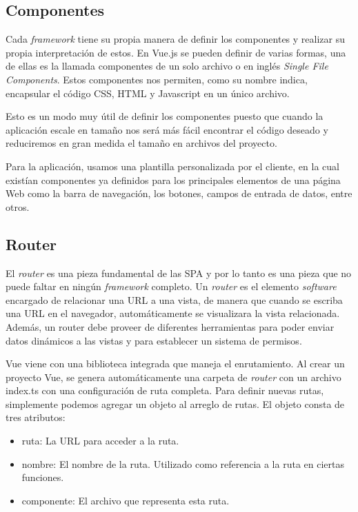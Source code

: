 \subsection{Componentes}
Cada \textit{framework} tiene su propia manera de definir los componentes y realizar su propia interpretación de estos. En Vue.js se pueden definir de varias formas, una de ellas  es la llamada componentes de un solo archivo o en inglés \textit{Single File Components}. Estos componentes nos permiten, como su nombre indica, encapsular el código CSS, HTML y Javascript en un único archivo.

Esto es un modo muy útil de definir los componentes puesto que cuando la aplicación escale en tamaño nos será más fácil encontrar el código deseado y reduciremos en gran medida el tamaño en archivos del proyecto.

Para la aplicación, usamos una plantilla personalizada por el cliente, en la cual existían componentes ya definidos para los principales elementos de una página Web como la barra de navegación, los botones, campos de entrada de datos, entre otros.


\subsection{Router}
El \textit{router} es una pieza fundamental de las SPA y por lo tanto es una pieza que no puede faltar en ningún \textit{framework} completo. Un \textit{router} es el elemento \textit{software} encargado de relacionar una URL a una vista, de manera que cuando se escriba una URL en el navegador, automáticamente se visualizara la vista relacionada. Además, un router debe proveer de diferentes herramientas para poder enviar datos dinámicos a las vistas y para establecer un sistema de permisos.

Vue viene con una biblioteca integrada que maneja el enrutamiento. Al crear un proyecto Vue, se genera automáticamente una carpeta de \textit{router} con un archivo index.ts con una configuración de ruta completa. Para definir nuevas rutas, simplemente podemos agregar un objeto al arreglo de rutas. El objeto consta de tres atributos:

\begin{itemize}
\item ruta: La URL para acceder a la ruta.
\item nombre: El nombre de la ruta. Utilizado como referencia a la ruta en ciertas funciones.
\item componente: El archivo que representa esta ruta.
\end{itemize}

